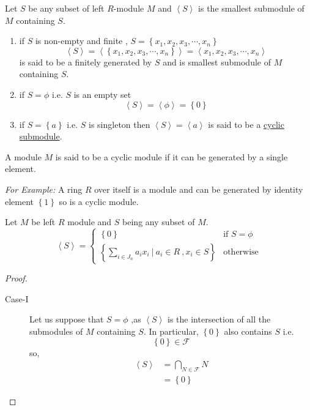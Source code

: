 \begin{remark}\qquad
	\begin{description}
	\item Let $S$ be any subset of left $R$-module $M$ and $\left\langle S \right\rangle $ is the smallest submodule of $M$ containing $S$.\newline
	\begin{enumerate}
		\item if $S$ is non-empty and finite , $S = \left\lbrace x_1,x_2,x_3, \cdots , x_n \right\rbrace $ \[ \left\langle S \right\rangle = \left\langle \left\lbrace x_1,x_2,x_3, \cdots , x_n \right\rbrace \right\rangle  = \left\langle x_1,x_2,x_3, \cdots , x_n \right\rangle \] is said to be a finitely generated by $S$ and is smallest submodule of $M$ containing $S$.
		\item if $S = \phi$ \quad i.e. $S$ is an empty set \[ \left\langle S \right\rangle = \left\langle \phi \right\rangle = \left\lbrace 0 \right\rbrace \]
		\item if $S = \left\lbrace a\right\rbrace $ \quad i.e. $S $ is singleton then $\left\langle S \right\rangle = \left\langle a\right\rangle $ is said to be a \underline{cyclic submodule}.
	\end{enumerate}
\end{description}
\end{remark}
\bigskip
\begin{definition}
	A module $M$ is said to be a cyclic module\cite{Cohn2005} if it can be generated by a single element.
\end{definition}
\textit{For Example:}
	A ring $R$ over itself is a module and can be generated by identity element $ \left\lbrace 1\right\rbrace $ so is a cyclic module.
\bigskip
\begin{thm}
	Let $M$ be left $R$ module and $S$ being any subset of $M$.
	\begin{equation*} \left\langle S\right\rangle = \begin{cases}
	\left\lbrace 0\right\rbrace & \text{if $S = \phi$} \\ \left\lbrace \sum\limits_{i \in J_n} a_i x_i \ \vert \  a_i \in R \ , x_i \in S\right\rbrace  & \text{otherwise}
	\end{cases}
	\end{equation*}
\end{thm}
\begin{proof}
\begin{description}
	\item[Case-I] Let us suppose that $S = \phi $ ,as $ \left\langle S\right\rangle $ is the intersection of all the submodules of $ M $ containing $S$. \newline \bigskip In particular, $ \left\lbrace 0\right\rbrace  $ also contains $S$ i.e. \[ \left\lbrace 0\right\rbrace  \in \mathcal{F}  \]
	so, \begin{align*} \left\langle S\right\rangle &= \bigcap_{N \in \mathcal{F}}N  \\& = \left\lbrace 0\right\rbrace   \end{align*}
\end{description}	
	
	
\end{proof} 